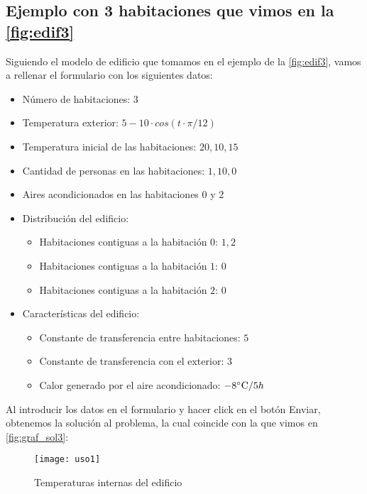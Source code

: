 \subsection{Ejemplo con 3 habitaciones que vimos en la \autoref{fig:edif3}}
Siguiendo el modelo de edificio que tomamos en el ejemplo de la \autoref{fig:edif3}, vamos a rellenar el formulario con los siguientes datos:
\begin{itemize}
	\item Número de habitaciones: $3$
	\item Temperatura exterior: $5 - 10\cdot cos(t\cdot \pi/12)$
	\item Temperatura inicial de las habitaciones: $20,10,15$
	\item Cantidad de personas en las habitaciones: $1,10,0$
	\item Aires acondicionados en las habitaciones $0$ y $2$
	\item Distribución del edificio: 
	\begin{itemize}
		\item Habitaciones contiguas a la habitación $0$: $1,2$
		\item Habitaciones contiguas a la habitación $1$: $0$
		\item Habitaciones contiguas a la habitación $2$: $0$
	\end{itemize}
	\item Características del edificio:
	\begin{itemize}
		\item Constante de transferencia entre habitaciones: $5$
		\item Constante de transferencia con el exterior: $3$
		\item Calor generado por el aire acondicionado: $-8\celsius / 5h$
	\end{itemize}
\end{itemize}
Al introducir los datos en el formulario y hacer click en el botón Enviar, obtenemos la solución al problema, la cual coincide con la que vimos en \autoref{fig:graf_sol3}:
\begin{figure}[h!]
	\centering
	\texttt{[image: uso1]}
	\caption{Temperaturas internas del edificio}
	\label{fig:caso1}
\end{figure}
